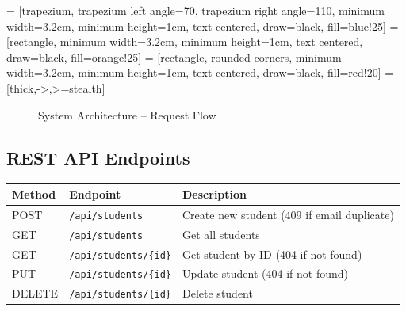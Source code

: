 \documentclass[12pt,a4paper]{article}
\begin{document}
   = [trapezium, trapezium left angle=70, trapezium right angle=110,
  minimum width=3.2cm, minimum height=1cm, text centered, draw=black, fill=blue!25]
 = [rectangle, minimum width=3.2cm, minimum height=1cm,
  text centered, draw=black, fill=orange!25]
   = [rectangle, rounded corners, minimum width=3.2cm,
  minimum height=1cm, text centered, draw=black, fill=red!20]
   = [thick,->,>=stealth]

\begin{figure}[h]
\centering
{}
\caption{System Architecture -- Request Flow}
\end{figure}

\subsection{REST API Endpoints}

\begin{tabularx}{\textwidth}{llX}
\toprule
\textbf{Method} & \textbf{Endpoint} & \textbf{Description} \\
\midrule
POST   & \texttt{/api/students}      & Create new student (409 if email duplicate) \\
GET    & \texttt{/api/students}      & Get all students \\
GET    & \texttt{/api/students/\{id\}} & Get student by ID (404 if not found) \\
PUT    & \texttt{/api/students/\{id\}} & Update student (404 if not found) \\
DELETE & \texttt{/api/students/\{id\}} & Delete student \\
\bottomrule
\end{tabularx}
\end{document}
